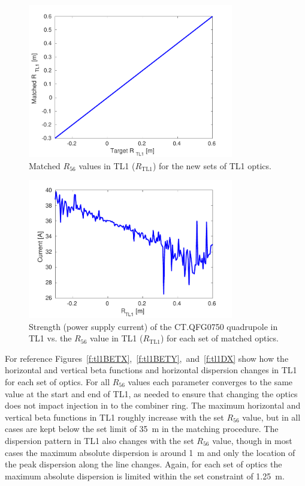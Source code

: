 \begin{figure}
  \centering
  \includegraphics[width=0.8\textwidth]{Figures/propagation/r56MatchedVsTarget}
  \caption{Matched \(R_{56}\) values in TL1 (\(R_{\mathrm{TL1}}\)) for the new sets of TL1 optics.}
  \label{f:r56MatchedVsTarget}
\end{figure}

\begin{figure}
  \centering
  \includegraphics[width=0.8\textwidth]{Figures/propagation/CTQFG0750}
  \caption{Strength (power supply current) of the CT.QFG0750 quadrupole in TL1 vs. the \(R_{56}\) value in TL1 (\(R_{\mathrm{TL1}}\)) for each set of matched optics.}
  \label{f:CTQFG0750}
\end{figure}

For reference Figures~\ref{f:tl1BETX},~\ref{f:tl1BETY},~and~\ref{f:tl1DX} show how the horizontal and vertical beta functions and horizontal dispersion changes in TL1 for each set of optics. For all \(R_{56}\) values each parameter converges to the same value at the start and end of TL1, as needed to ensure that changing the optics does not impact injection in to the combiner ring. The maximum horizontal and vertical beta functions in TL1 roughly increase with the set \(R_{56}\) value, but in all cases are kept below the set limit of 35~m in the matching procedure. The dispersion pattern in TL1 also changes with the set \(R_{56}\) value, though in most cases the maximum absolute dispersion is around 1~m and only the location of the peak dispersion along the line changes. Again, for each set of optics the maximum absolute dispersion is limited within the set constraint of 1.25~m. 

